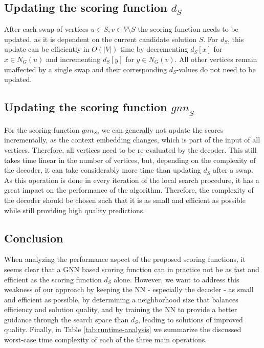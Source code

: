 \documentclass[draft,final]{vutinfth} %
\begin{document}
\subsection{Updating the scoring function $d_S$}
After each swap of vertices $u \in S, v \in V \setminus S$ the scoring function needs to be updated, as it is dependent on the current candidate solution $S$. For $d_S$, this update can be efficiently in $O(|V|)$ time by decrementing $d_S[x]$ for $x \in N_G(u)$ and incrementing $d_S[y]$ for $y \in N_G(v)$. All other vertices remain unaffected by a single swap and their corresponding $d_S$-values do not need to be updated. 

\subsection{Updating the scoring function $\mathit{gnn}_S$}

For the scoring function $gnn_S$, we can generally not update the scores incrementally, as the context embedding changes, which is part of the input of all vertices. Therefore, all vertices need to be re-evaluated by the decoder. This still takes time linear in the number of vertices, but, depending on the complexity of the decoder, it can take considerably more time than updating $d_S$ after a swap. As this operation is done in every iteration of the local search procedure, it has a great impact on the performance of the algorithm. Therefore, the complexity of the decoder should be chosen such that it is as small and efficient as possible while still providing high quality predictions. 

\subsection{Conclusion}
When analyzing the performance aspect of the proposed scoring functions, it seems clear that a GNN based scoring function can in practice not be as fast and efficient as the scoring function $d_S$ alone. However, we want to address this weakness of our approach by keeping the NN - especially the decoder - as small and efficient as possible, by determining a neighborhood size that balances efficiency and solution quality, and by training the NN to provide a better guidance through the search space than $d_S$, leading to solutions of improved quality. Finally, in Table \ref{tab:runtime-analysis} we summarize the discussed worst-case time complexity of each of the three main operations. 
\end{document}
